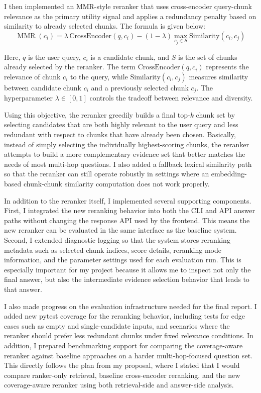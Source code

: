 \documentclass[sigconf]{acmart}
\begin{document}
I then implemented an MMR-style reranker that uses cross-encoder query-chunk relevance as the primary utility signal and applies a redundancy penalty based on similarity to already selected chunks. The formula is given below:
\[
\operatorname{MMR}(c_i)
=
\lambda \,\mathrm{CrossEncoder}(q, c_i)
-
(1-\lambda)\max_{c_j \in S}\mathrm{Similarity}(c_i, c_j)
\]

Here, \(q\) is the user query, \(c_i\) is a candidate chunk, and \(S\) is the set of chunks already selected by the reranker. The term \(\mathrm{CrossEncoder}(q, c_i)\) represents the relevance of chunk \(c_i\) to the query, while \(\mathrm{Similarity}(c_i, c_j)\) measures similarity between candidate chunk \(c_i\) and a previously selected chunk \(c_j\). The hyperparameter \(\lambda \in [0,1]\) controls the tradeoff between relevance and diversity.

Using this objective, the reranker greedily builds a final top-\(k\) chunk set by selecting candidates that are both highly relevant to the user query and less redundant with respect to chunks that have already been chosen. Basically, instead of simply selecting the individually highest-scoring chunks, the reranker attempts to build a more complementary evidence set that better matches the needs of most multi-hop questions. I also added a fallback lexical similarity path so that the reranker can still operate robustly in settings where an embedding-based chunk-chunk similarity computation does not work properly.

In addition to the reranker itself, I implemented several supporting components. First, I integrated the new reranking behavior into both the CLI and API answer paths without changing the response API used by the frontend. This means the new reranker can be evaluated in the same interface as the baseline system. Second, I extended diagnostic logging so that the system stores reranking metadata such as selected chunk indices, score details, reranking mode information, and the parameter settings used for each evaluation run. This is especially important for my project because it allows me to inspect not only the final answer, but also the intermediate evidence selection behavior that leads to that answer.

I also made progress on the evaluation infrastructure needed for the final report. I added new pytest coverage for the reranking behavior, including tests for edge cases such as empty and single-candidate inputs, and scenarios where the reranker should prefer less redundant chunks under fixed relevance conditions. In addition, I prepared benchmarking support for comparing the coverage-aware reranker against baseline approaches on a harder multi-hop-focused question set. This directly follows the plan from my proposal, where I stated that I would compare ranker-only retrieval, baseline cross-encoder reranking, and the new coverage-aware reranker using both retrieval-side and answer-side analysis.
\end{document}
